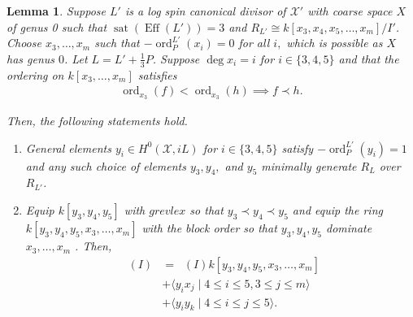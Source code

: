 \documentclass{amsart}
\theoremstyle{plain}
\newtheorem{lem}[thm]{Lemma}
\theoremstyle{definition}
\theoremstyle{remark}
\numberwithin{equation}{section}
\newcommand \sx{\mathscr X}
\DeclareMathOperator{\ord}{ord}
\newcommand{\halfcan}{L}
\DeclareMathOperator{\initial}{in_\prec}
\DeclareMathOperator{\Eff}{Eff}
\DeclareMathOperator{\sat}{sat}
\begin{document}
\begin{lem}
\label{lem:sat-3}
Suppose $L'$ is a log spin canonical divisor of $\sx'$ with coarse
space $X$ of genus 0 such that $\sat(\Eff(\halfcan')) = 3$ and $R_
{\halfcan'} \cong k[x_3, x_4 , x_5, \ldots, x_m]/I'$. Choose $x_3, \ldots, x_m$ such that $-\ord^{L'}_P(x_i)=0$ for all $i,$ which is possible as $X$ has genus $0$. Let $L = L' + \frac
{1}{3}P$. Suppose $\deg x_i = i$ for $i \in \{3, 4, 5\}$ and that
the ordering on $k[x_3, \ldots, x_m]$ satisfies
\begin{align*}
	\ord_{x_3}(f) < \ord_{x_3}(h) \implies f \prec h.
\end{align*}

\noindent
Then, the following statements hold.

\begin{enumerate}
	\item[(a)] General elements  $y_i \in H^0(\sx, iL)$ for $i \in \{3,
		4,5\}$ satisfy $-\ord_P^{\halfcan'}(y_i) = 1$ and any such choice of elements $y
		_3, y_4,$ and $y_5$ minimally generate $R_\halfcan$ over $R_{\halfcan'}$.
	\item[(b)] Equip $k[y_3, y_4, y_5]$ with $grevlex$ so that $y_3 \prec 
		y_4 \prec y_5$
		and equip the ring $k[y_3, y_4, y_5, x_3, \ldots, x_m]$ with the block order so that $y_3, y_4, y_5$ dominate $x_3, \ldots, x_m$ .  Then,
		\begin{align*}
			\initial(I) &= \initial(I) k[y_3, y_4, y_5, x_3, \ldots, x_m] \\
			&+ \langle y_i x_j \mid 4 \leq i \leq 5, 3 \leq j \leq m\rangle \\
			&+ \langle y_i y_k \mid 4 \leq i \leq j \leq 5\rangle.
		\end{align*}
\end{enumerate}
\end{lem}
\end{document}
